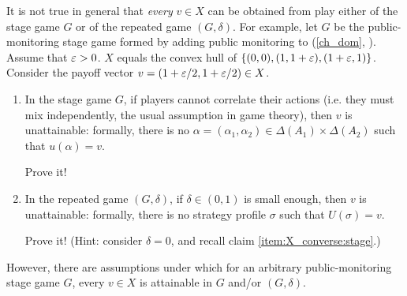 \begin{remark}
	\label{remark:X_converse}
	It is not true in general that \emph{every} $v \in X$ can be obtained from play either of the stage game $G$ or of the repeated game $(G,\delta)$. For example, let $G$ be the public-monitoring stage game formed by adding public monitoring to  (\cref{ch_dom}, ). Assume that $\varepsilon>0$. $X$ equals the convex hull of $\{ (0,0), (1,1+\varepsilon), (1+\varepsilon,1) \}$. Consider the payoff vector $v = \left( 1+\eps/2, 1+\eps/2 \right) \in X$.

	\begin{enumerate}[label=(\alph*)]
	
		\item \label{item:X_converse:stage} In the stage game $G$, if players cannot correlate their actions (i.e. they must mix independently, the usual assumption in game theory), then $v$ is unattainable: formally, there is no $\alpha = (\alpha_1,\alpha_2) \in \Delta(A_1) \times \Delta(A_2)$ such that $u(\alpha) = v$.

		\begin{exercise}
			\label{exercise:X_converse:stage}
			Prove it!
		\end{exercise}

		\item \label{item:X_converse:rep} In the repeated game $(G,\delta)$, if $\delta \in (0,1)$ is small enough, then $v$ is unattainable: formally, there is no strategy profile $\sigma$ such that $U(\sigma)=v$.

		\begin{exercise}
			\label{exercise:X_converse:rep}
			Prove it! (Hint: consider $\delta=0$, and recall claim \ref{item:X_converse:stage}.)
		\end{exercise}
	
	\end{enumerate}

	However, there are assumptions under which for an arbitrary public-monitoring stage game $G$, every $v \in X$ is attainable in $G$ and/or $(G,\delta)$.

	\begin{enumerate}[label=(\alph*),resume]


\end{enumerate}
\end{remark}
